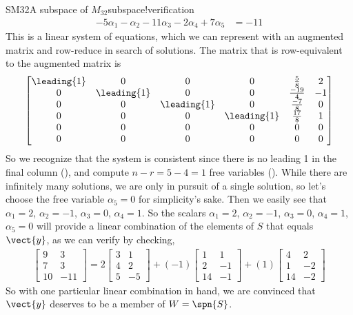 \begin{example}{SM32}{A subspace of $M_{32}$}{subspace!verification}
\begin{align*}
-5\alpha_1 -\alpha_2 -11\alpha_3 -2\alpha_4 +7\alpha_5&=-11
\end{align*}
%
This is a linear system of equations, which we can represent with an augmented matrix and row-reduce in search of solutions.  The matrix that is row-equivalent to the augmented matrix is
%
\begin{equation*}
\begin{bmatrix}
\leading{1} & 0 & 0 & 0 & \frac{5}{8} & 2\\
0 & \leading{1} & 0 & 0 & \frac{-19}{4} & -1\\
0 & 0 & \leading{1} & 0 & \frac{-7}{8} & 0\\
0 & 0 & 0 & \leading{1} & \frac{17}{8} & 1\\
0 & 0 & 0 & 0 & 0 & 0\\
0 & 0 & 0 & 0 & 0 & 0
\end{bmatrix}
\end{equation*}
%
So we recognize that the system is consistent since there is no leading 1 in the final column (), and compute $n-r=5-4=1$ free variables ().  While there are infinitely many solutions, we are only in pursuit of a single solution, so let's choose the free variable $\alpha_5=0$ for simplicity's sake.  Then we easily see that $\alpha_1=2$, $\alpha_2=-1$, $\alpha_3=0$, $\alpha_4=1$.  So the scalars $\alpha_1=2$, $\alpha_2=-1$, $\alpha_3=0$, $\alpha_4=1$, $\alpha_5=0$ will provide a linear combination of the elements of $S$ that equals $\vect{y}$, as we can verify by checking,
%
\begin{align*}
\begin{bmatrix}
9 & 3 \\ 7 & 3 \\ 10 & -11
\end{bmatrix}
=
2
\begin{bmatrix}
3 & 1 \\ 4 & 2 \\ 5 & -5
\end{bmatrix}
+(-1)
\begin{bmatrix}
1 & 1 \\ 2 & -1 \\ 14 & -1
\end{bmatrix}
+(1)
\begin{bmatrix}
4 & 2 \\ 1 & -2 \\ 14 & -2
\end{bmatrix}
%
\end{align*}
%
So with one particular linear combination in hand, we are convinced that $\vect{y}$ deserves to be a member of $W=\spn{S}$.

\end{example}
